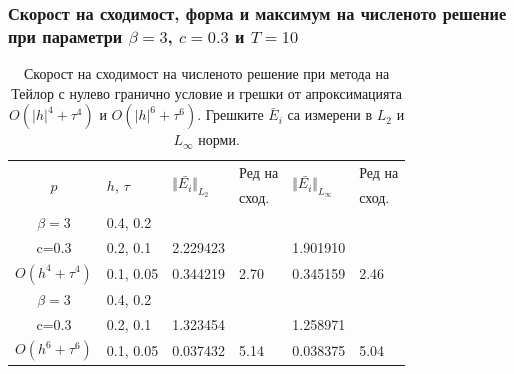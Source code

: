 \documentclass[a4paper]{article}
\theoremstyle{remark}
\begin{document}
\subsubsection{Скорост на сходимост, форма и максимум на численото решение при параметри $\beta = 3$, $c=0.3$ и $T=10$}
\begin{table}[ht]
\centering
\small
		\begin{tabular}{||c|l|ll|ll||}
			\hline
			\hline
      \multirow{2  }{*}{ $p$ }        & \multirow{2  }{*}{$h$, $\tau$}  &  	\multirow{2  }{*}{ $\Vert \bar{ E_i} \Vert_{L_2}$ }	&Ред на	& \multirow{2  }{*}{ $\Vert \bar{ E_i} \Vert_{L_\infty}$ } 		&Ред на   \\
	                                        &                                                & 							 					&  сход. 	& 								       					& сход. \\
\hline 
\hline 
       $\beta=3$        	&0.4, 0.2      &             	&            &           &   \\
           c=0.3    		&0.2, 0.1      &  2.229423 &            & 1.901910 &   \\
  $O(h^4+ \tau^4)$  	&0.1, 0.05   	&  0.344219 	&2.70  	 & 0.345159  &  2.46 \\

\hline
  $\beta=3$     		&0.4, 0.2   	&            	&          	&                  &      \\
      c=0.3                  &0.2, 0.1   	&1.323454   &            &1.258971 &   \\
 $O(h^6+ \tau^6)$ 	&0.1, 0.05 	&  0.037432 	&5.14  	 &0.038375  & 5.04 \\
\hline
\hline 
		\end{tabular}
		\caption{Скорост на сходимост на численото решение при метода на Тейлор с нулево гранично условие и грешки от апроксимацията $O(|h|^{4} + \tau^4 )$ и $O(|h|^{6} + \tau^6 )$. Грешките $\bar E_i$ са измерени в $L_2$ и $L_\infty$ норми.}
\label{tableH}
\end{table}
\end{document}
